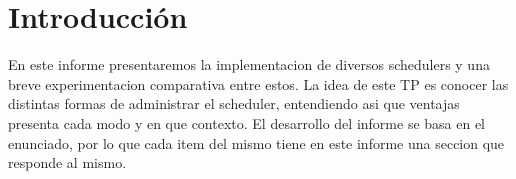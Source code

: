 \section{Introducci\'on}

En este informe presentaremos la implementacion de diversos schedulers y una breve experimentacion comparativa entre estos. 
La idea de este TP es conocer las distintas formas de administrar el scheduler, entendiendo asi que ventajas presenta cada modo y en que contexto.
El desarrollo del informe se basa en el enunciado, por lo que cada item del mismo tiene en este informe una seccion que responde al mismo.


